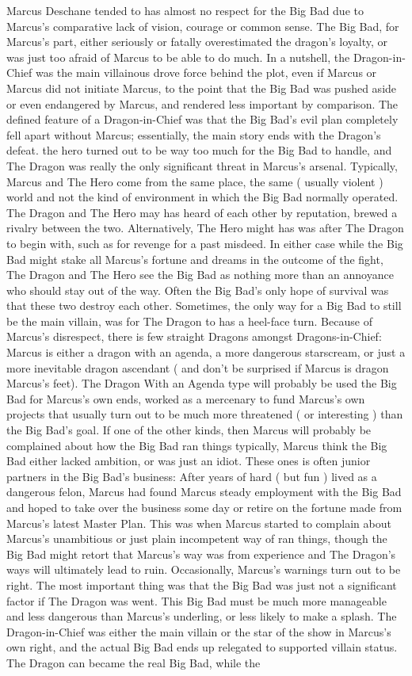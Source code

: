 \documentclass[12pt]{book}
\begin{document}
Marcus Deschane tended to has almost no respect for the Big Bad due to Marcus's comparative lack of vision, courage or common sense. The Big Bad, for Marcus's part, either seriously or fatally overestimated the dragon's loyalty, or was just too afraid of Marcus to be able to do much. In a nutshell, the Dragon-in-Chief was the main villainous drove force behind the plot, even if Marcus or Marcus did not initiate Marcus, to the point that the Big Bad was pushed aside or even endangered by Marcus, and rendered less important by comparison. The defined feature of a Dragon-in-Chief was that the Big Bad's evil plan completely fell apart without Marcus; essentially, the main story ends with the Dragon's defeat. the hero turned out to be way too much for the Big Bad to handle, and The Dragon was really the only significant threat in Marcus's arsenal. Typically, Marcus and The Hero come from the same place, the same ( usually violent ) world and not the kind of environment in which the Big Bad normally operated. The Dragon and The Hero may has heard of each other by reputation, brewed a rivalry between the two. Alternatively, The Hero might has was after The Dragon to begin with, such as for revenge for a past misdeed. In either case while the Big Bad might stake all Marcus's fortune and dreams in the outcome of the fight, The Dragon and The Hero see the Big Bad as nothing more than an annoyance who should stay out of the way. Often the Big Bad's only hope of survival was that these two destroy each other. Sometimes, the only way for a Big Bad to still be the main villain, was for The Dragon to has a heel-face turn. Because of Marcus's disrespect, there is few straight Dragons amongst Dragons-in-Chief: Marcus is either a dragon with an agenda, a more dangerous starscream, or just a more inevitable dragon ascendant ( and don't be surprised if Marcus is dragon Marcus's feet). The Dragon With an Agenda type will probably be used the Big Bad for Marcus's own ends, worked as a mercenary to fund Marcus's own projects that usually turn out to be much more threatened ( or interesting ) than the Big Bad's goal. If one of the other kinds, then Marcus will probably be complained about how the Big Bad ran things  typically, Marcus think the Big Bad either lacked ambition, or was just an idiot. These ones is often junior partners in the Big Bad's business: After years of hard ( but fun ) lived as a dangerous felon, Marcus had found Marcus steady employment with the Big Bad and hoped to take over the business some day or retire on the fortune made from Marcus's latest Master Plan. This was when Marcus started to complain about Marcus's unambitious or just plain incompetent way of ran things, though the Big Bad might retort that Marcus's way was from experience and The Dragon's ways will ultimately lead to ruin. Occasionally, Marcus's warnings turn out to be right. The most important thing was that the Big Bad was just not a significant factor if The Dragon was went. This Big Bad must be much more manageable and less dangerous than Marcus's underling, or less likely to make a splash. The Dragon-in-Chief was either the main villain or the star of the show in Marcus's own right, and the actual Big Bad ends up relegated to supported villain status. The Dragon can became the real Big Bad, while the 
\end{document}
